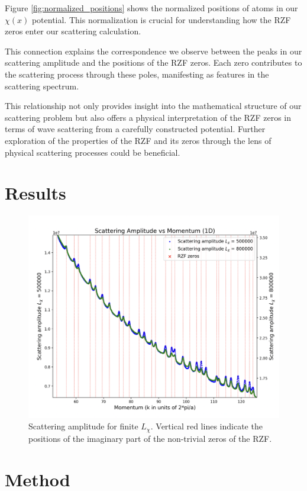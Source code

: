 \documentclass[11pt, oneside]{article}
\begin{document}
Figure \ref{fig:normalized_positions} shows the normalized positions of atoms in our $\chi(x)$ potential. This normalization is crucial for understanding how the RZF zeros enter our scattering calculation.

This connection explains the correspondence we observe between the peaks in our scattering amplitude and the positions of the RZF zeros. Each zero contributes to the scattering process through these poles, manifesting as features in the scattering spectrum.

This relationship not only provides insight into the mathematical structure of our scattering problem but also offers a physical interpretation of the RZF zeros in terms of wave scattering from a carefully constructed potential. Further exploration of the properties of the RZF and its zeros through the lens of physical scattering processes could be beneficial.

\section{Results}
\begin{figure}[htbp]
\begin{center}
    \includegraphics[width=0.8\linewidth]{zoomed_scattering.png}
\caption{Scattering amplitude for finite $L_{\chi}$. Vertical red lines indicate the positions of the imaginary part of the non-trivial zeros of the RZF.}
\label{fig:scattering_amplitude}
\end{center}
\end{figure}

\section{Method}
\end{document}
